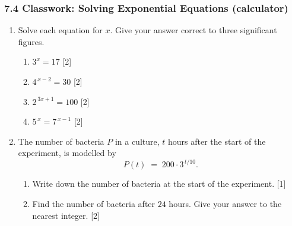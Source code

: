 \documentclass[12pt, twoside]{article}
\begin{document}
\subsubsection*{7.4 Classwork: Solving Exponential Equations (calculator)}

\begin{enumerate}[itemsep=0.4cm]

\item[1.] [Maximum mark: 8]

Solve each equation for $x$. Give your answer correct to three
significant figures.

\begin{enumerate}[itemsep=0.4cm]
  \item $3^x = 17$ \hfill [2]

  \vspace{3.4cm}

  \item $4^{\,x-2} = 30$ \hfill [2]

  \vspace{3.4cm}

  \item $2^{\,3x+1} = 100$ \hfill [2]

  \vspace{3.4cm}

  \item $5^{\,x} = 7^{\,x-1}$ \hfill [2]

  \vspace{3.4cm}
\end{enumerate}

\newpage

\item[2.] [Maximum mark: 7]

The number of bacteria $P$ in a culture, $t$ hours after the start of
the experiment, is modelled by
$$P(t) \;=\; 200 \cdot 3^{\,t/10}.$$

\begin{enumerate}[itemsep=0.4cm]
  \item Write down the number of bacteria at the start of the experiment.
  \hfill [1]

  \vspace{2.5cm}

  \item Find the number of bacteria after $24$ hours. Give your answer
  to the nearest integer. \hfill [2]


\end{enumerate}
\end{enumerate}
\end{document}
